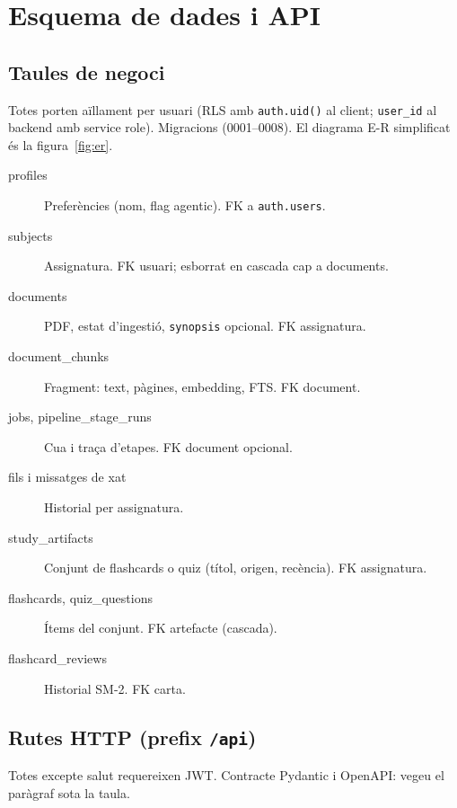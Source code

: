 \chapter{Esquema de dades i API}
\label{anexo:esquema}

\section{Taules de negoci}

Totes porten aïllament per usuari (RLS amb \texttt{auth.uid()} al client; \texttt{user\_id} al backend amb service role). Migracions  (0001--0008). El diagrama E-R simplificat és la figura~\ref{fig:er}.

\begin{description}
  \item[profiles] Preferències (nom, flag agentic). FK a \texttt{auth.users}.
  \item[subjects] Assignatura. FK usuari; esborrat en cascada cap a documents.
  \item[documents] PDF, estat d'ingestió, \texttt{synopsis} opcional. FK assignatura.
  \item[document\_chunks] Fragment: text, pàgines, embedding, FTS. FK document.
  \item[jobs, pipeline\_stage\_runs] Cua i traça d'etapes. FK document opcional.
  \item[fils i missatges de xat] Historial per assignatura.
  \item[study\_artifacts] Conjunt de flashcards o quiz (títol, origen, recència). FK assignatura.
  \item[flashcards, quiz\_questions] Ítems del conjunt. FK artefacte (cascada).
  \item[flashcard\_reviews] Historial SM-2. FK carta.
\end{description}

\section{Rutes HTTP (prefix \texttt{/api})}

Totes excepte salut requereixen JWT. Contracte Pydantic i OpenAPI: vegeu el paràgraf sota la taula.

